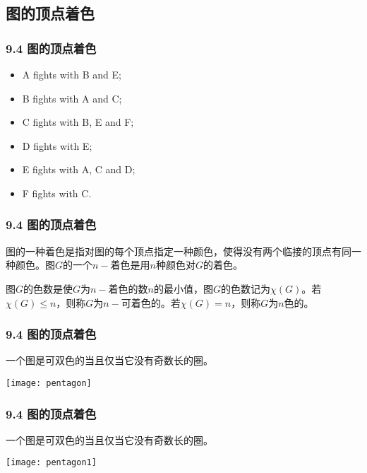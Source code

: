 \documentclass{beamer}
\begin{document}
\begin{CJK}{UTF8}{gbsn}
\section{图的顶点着色}
\begin{frame}
  \frametitle{9.4 图的顶点着色}
  \begin{itemize}
  \item A fights with B and E;
  \item B fights with A and C;
  \item C fights with B, E and F;
  \item D fights with E;
  \item E fights with A, C and D;
    \item F fights with C.
  \end{itemize}
\end{frame}
\begin{frame}
  \frametitle{9.4 图的顶点着色}
  \begin{Def}
    图的一种\alert{着色}是指对图的每个顶点指定一种颜色，使得没有两个临接的顶点有同一种颜色。图$G$的一个\alert{$n-$着色}是用$n$种颜色对$G$的着色。
  \end{Def}
  \begin{Def}
    图$G$的\alert{色数}是使$G$为$n-$着色的数$n$的最小值，图$G$的色数记为$\chi(G)$。若$\chi (G) \leq n$，则称$G$为\alert{$n-$可着色}的。若$\chi (G) = n$，则称$G$为\alert{$n$色}的。
  \end{Def}
\end{frame}
\begin{frame}
  \frametitle{9.4 图的顶点着色}
  \begin{Thm}
    一个图是可双色的当且仅当它没有奇数长的圈。
  \end{Thm}
\vspace{1cm}
  \begin{minipage}{0.45\linewidth}
\texttt{[image: pentagon]}    
  \end{minipage}
  \begin{minipage}{0.45\linewidth}
   
  \end{minipage}
\end{frame}

\begin{frame}
  \frametitle{9.4 图的顶点着色}
  \begin{Thm2}
    一个图是可双色的当且仅当它没有奇数长的圈。
  \end{Thm2}
\vspace{1cm}
  \begin{minipage}{0.45\linewidth}
\texttt{[image: pentagon1]}    
  \end{minipage}
  \begin{minipage}{0.45\linewidth}
   

\end{minipage}
\end{frame}
\end{CJK}
\end{document}
